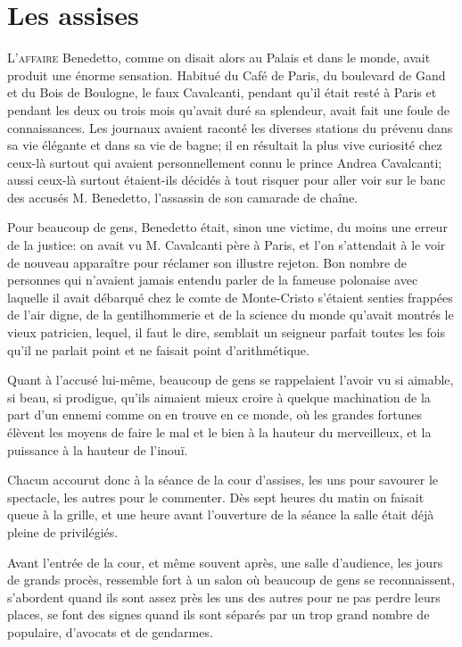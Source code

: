 \chapter{Les assises} 

\lettrine{L}{'affaire} Benedetto, comme on disait alors au Palais et dans le monde, avait produit une énorme sensation. Habitué du Café de Paris, du boulevard de Gand et du Bois de Boulogne, le faux Cavalcanti, pendant qu'il était resté à Paris et pendant les deux ou trois mois qu'avait duré sa splendeur, avait fait une foule de connaissances. Les journaux avaient raconté les diverses stations du prévenu dans sa vie élégante et dans sa vie de bagne; il en résultait la plus vive curiosité chez ceux-là surtout qui avaient personnellement connu le prince Andrea Cavalcanti; aussi ceux-là surtout étaient-ils décidés à tout risquer pour aller voir sur le banc des accusés M. Benedetto, l'assassin de son camarade de chaîne. 

Pour beaucoup de gens, Benedetto était, sinon une victime, du moins une erreur de la justice: on avait vu M. Cavalcanti père à Paris, et l'on s'attendait à le voir de nouveau apparaître pour réclamer son illustre rejeton. Bon nombre de personnes qui n'avaient jamais entendu parler de la fameuse polonaise avec laquelle il avait débarqué chez le comte de Monte-Cristo s'étaient senties frappées de l'air digne, de la gentilhommerie et de la science du monde qu'avait montrés le vieux patricien, lequel, il faut le dire, semblait un seigneur parfait toutes les fois qu'il ne parlait point et ne faisait point d'arithmétique. 

Quant à l'accusé lui-même, beaucoup de gens se rappelaient l'avoir vu si aimable, si beau, si prodigue, qu'ils aimaient mieux croire à quelque machination de la part d'un ennemi comme on en trouve en ce monde, où les grandes fortunes élèvent les moyens de faire le mal et le bien à la hauteur du merveilleux, et la puissance à la hauteur de l'inouï. 

Chacun accourut donc à la séance de la cour d'assises, les uns pour savourer le spectacle, les autres pour le commenter. Dès sept heures du matin on faisait queue à la grille, et une heure avant l'ouverture de la séance la salle était déjà pleine de privilégiés. 

Avant l'entrée de la cour, et même souvent après, une salle d'audience, les jours de grands procès, ressemble fort à un salon où beaucoup de gens se reconnaissent, s'abordent quand ils sont assez près les uns des autres pour ne pas perdre leurs places, se font des signes quand ils sont séparés par un trop grand nombre de populaire, d'avocats et de gendarmes. 

